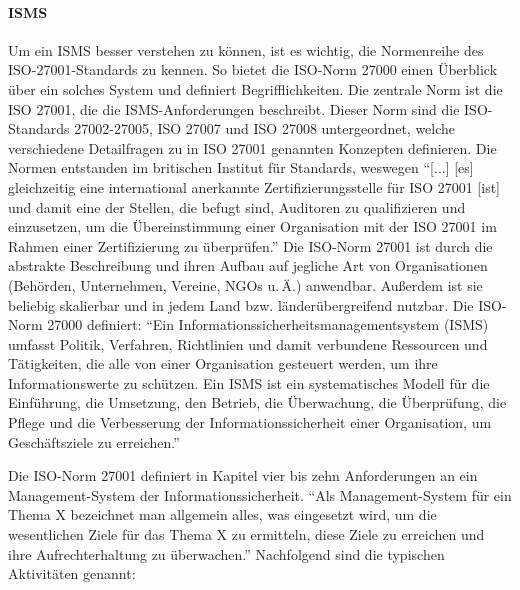 \paragraph{\ac{ISMS}}\label{kap:ISMS}
Um ein \ac{ISMS} besser verstehen zu können, ist es wichtig, die Normenreihe des ISO-27001-Standards zu kennen. So bietet die ISO-Norm 27000 einen Überblick über ein solches System und definiert Begrifflichkeiten. Die zentrale Norm ist die ISO 27001, die die \ac{ISMS}-Anforderungen beschreibt.\autocite[vgl.][]{dindeutsches_institut_fur_normung_informationstechnik_2020} Dieser Norm sind die ISO-Standards 27002-27005, ISO 27007 und ISO 27008 untergeordnet, welche verschiedene Detailfragen zu in ISO 27001 genannten Konzepten definieren. Die Normen entstanden im britischen Institut für Standards, weswegen \enquote{[...] [es] gleichzeitig eine international anerkannte Zertifizierungsstelle für ISO 27001 [ist] und damit eine der Stellen, die befugt sind, Auditoren zu qualifizieren und einzusetzen, um die Übereinstimmung einer Organisation mit der ISO 27001 im Rahmen einer Zertifizierung zu überprüfen.}\autocite[vgl.][S.\,2]{kersten_it-sicherheitsmanagement_2020} Die ISO-Norm 27001 ist durch die abstrakte Beschreibung und ihren Aufbau auf jegliche Art von Organisationen (Behörden, Unternehmen, Vereine, \ac{NGOs} u.\,Ä.) anwendbar. Außerdem ist sie beliebig skalierbar und in jedem Land bzw. länderübergreifend nutzbar.\autocite[vgl.][S.\,4]{kersten_it-sicherheitsmanagement_2020} Die ISO-Norm 27000 definiert: \enquote{Ein Informationssicherheitsmanagementsystem (ISMS) umfasst Politik, Verfahren, Richtlinien und damit verbundene Ressourcen und Tätigkeiten,   die alle von einer Organisation gesteuert werden, um ihre Informationswerte zu  schützen. Ein ISMS ist ein systematisches Modell für die Einführung, die Umsetzung,  den Betrieb, die Überwachung, die Überprüfung, die Pflege und die Verbesserung der Informationssicherheit einer Organisation, um Geschäftsziele zu erreichen.}\autocite[][S.\,20]{dindeutsches_institut_fur_normung_informationstechnik_2019}
\par
Die ISO-Norm 27001 definiert in Kapitel vier bis zehn Anforderungen an ein Management-System der Informationssicherheit.\autocite[vgl.][S.\,6-16]{dindeutsches_institut_fur_normung_informationstechnik_2020} \enquote{Als Management-System für ein Thema X bezeichnet man allgemein alles, was eingesetzt wird, um die wesentlichen Ziele für das Thema X zu ermitteln, diese Ziele zu erreichen und ihre Aufrechterhaltung zu überwachen.}\autocite[][S.\,5]{kersten_it-sicherheitsmanagement_2020} Nachfolgend sind die typischen Aktivitäten genannt\autocite[][S.\,5]{kersten_it-sicherheitsmanagement_2020}:
